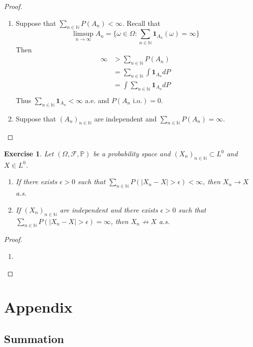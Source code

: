 \documentclass[12pt]{amsart}
\newtheorem{ex}[thm]{Exercise}
\newcommand{\ep}{\epsilon}
\newcommand{\om}{\omega}
\newcommand{\Om}{\Omega}
\newcommand{\N}{\mathbb{N}}
\renewcommand{\P}{\mathbb{P}}
\newcommand{\MF}{\mathcal{F}}
\newcommand{\io}{\text{ i.o.}}
\begin{document}
	\begin{proof}\
		\begin{enumerate}
			\item Suppose that $\sum\limits_{n \in \N}P(A_n) < \infty$. Recall that $$\limsup\limits_{n \rightarrow \infty}A_n = \bigg \{\om \in \Om: \sum\limits_{n \in \N}\mathbf{1}_{A_n}(\om) = \infty \bigg \}$$ Then \begin{align*}
				\infty 
				&> \sum_{n \in \N}P(A_n) \\
				&= \sum_{n \in \N} \int \mathbf{1}_{A_n}dP \\
				&= \int \sum_{n \in \N} \mathbf{1}_{A_n}dP \\
			\end{align*}
			Thus $\sum\limits_{n \in \N} \mathbf{1}_{A_n} < \infty$ a.e. and $P(A_n \io) = 0$.
			\item Suppose that $(A_n)_{n \in \N}$ are independent and $\sum\limits_{n \in \N} P(A_n) = \infty$.
		\end{enumerate}
	\end{proof}
	
	\begin{ex}
		Let $(\Om, \MF, \P)$ be a probability space and $(X_n)_{n \in \N} \subset L^0$ and $X \in L^0$. 
		\begin{enumerate}
			\item If there exists $\ep >0 $ such that $\sum\limits_{n \in \N} P(|X_n -X| > \ep) < \infty$, then $X_n \rightarrow X$ a.s.
			\item If $(X_n)_{n \in \N}$ are independent and there exists $\ep >0$ such that $\sum\limits_{n \in \N} P(|X_n -X| > \ep) = \infty$, then $X_n \not \rightarrow X$ a.s.
		\end{enumerate}
	\end{ex}
	
	\begin{proof}
		\begin{enumerate}
			\item 
		\end{enumerate}
	\end{proof}
	\newpage

	
	\section{Appendix}
	
	\subsection{Summation}
	
\end{document}
